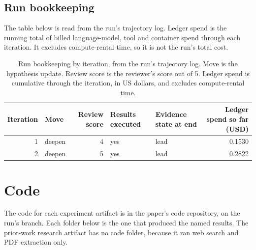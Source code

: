 \documentclass[11pt,letterpaper]{article}
\begin{document}
\subsection*{Run bookkeeping}

The table below is read from the run's trajectory log. Ledger spend is the running total of billed language-model, tool and container spend through each iteration. It excludes compute-rental time, so it is not the run's total cost.

\begin{table}[!htbp]
\centering
\footnotesize
\caption{Run bookkeeping by iteration, from the run's trajectory log. Move is the hypothesis update. Review score is the reviewer's score out of 5. Ledger spend is cumulative through the iteration, in US dollars, and excludes compute-rental time.}
\label{tab:bookkeeping}
\begin{tabularx}{\linewidth}{r l r l l r}
\toprule
Iteration & Move & Review score & Results executed & Evidence state at end & Ledger spend so far (USD) \\
\midrule
1 & deepen & 4 & yes & lead & 0.1530 \\
2 & deepen & 5 & yes & lead & 0.2822 \\
\bottomrule
\end{tabularx}
\end{table}

\section{Code}\label{sec:code}

The code for each experiment artifact is in the paper's code repository, on the run's branch. Each folder below is the one that produced the named results. The prior-work research artifact has no code folder, because it ran web search and PDF extraction only.
\end{document}
